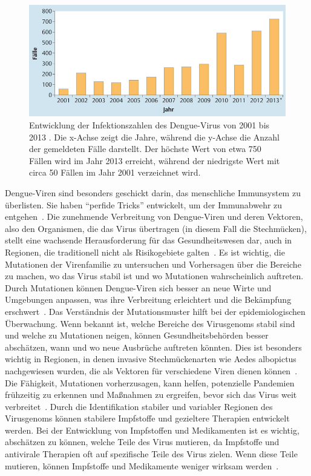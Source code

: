 \documentclass[german,version-2022-01]{uzl-thesis}
\begin{document}
\begin{figure}[tbp]
  \centering
  \includegraphics[scale=0.5]{Images/infektionszahlen_dengue_virus_deutschland.jpeg}
  \caption{Entwicklung der Infektionszahlen des Dengue-Virus von 2001 bis 2013 \cite{cramer_dengue-virus_2014}. Die x-Achse zeigt die Jahre, w\"ahrend die y-Achse die Anzahl der gemeldeten F\"alle darstellt. Der h\"ochste Wert von etwa 750 F\"allen wird im Jahr 2013 erreicht, w\"ahrend der niedrigste Wert mit circa 50 F\"allen im Jahr 2001 verzeichnet wird.}
  \label{fig:Dengue_virus_infektionszahlen_deutschland}
\end{figure} Dengue-Viren sind besonders geschickt darin, das menschliche Immunsystem zu \"uberlisten. Sie haben "`perfide Tricks"' entwickelt, um der Immunabwehr zu entgehen~\cite{janisch_klein_2017}. Die zunehmende Verbreitung von Dengue-Viren und deren Vektoren, also den Organismen, die das Virus \"ubertragen (in diesem Fall die Stechm\"ucken), stellt eine wachsende Herausforderung f\"ur das Gesundheitswesen dar, auch in Regionen, die traditionell nicht als Risikogebiete galten~\cite{cramer_dengue-virus_2014}. Es ist wichtig, die Mutationen der Virenfamilie zu untersuchen und Vorhersagen \"uber die Bereiche zu machen, wo das Virus stabil ist und wo Mutationen wahrscheinlich auftreten. Durch Mutationen k\"onnen Dengue-Viren sich besser an neue Wirte und Umgebungen anpassen, was ihre Verbreitung erleichtert und die Bek\"ampfung erschwert~\cite{cramer_dengue-virus_2014, janisch_klein_2017}. Das Verst\"andnis der Mutationsmuster hilft bei der epidemiologischen \"Uberwachung. Wenn bekannt ist, welche Bereiche des Virusgenoms stabil sind und welche zu Mutationen neigen, k\"onnen Gesundheitsbeh\"orden besser absch\"atzen, wann und wo neue Ausbr\"uche auftreten k\"onnten. Dies ist besonders wichtig in Regionen, in denen invasive Stechm\"uckenarten wie Aedes albopictus nachgewiesen wurden, die als Vektoren f\"ur verschiedene Viren dienen k\"onnen~\cite{cramer_dengue-virus_2014}. Die F\"ahigkeit, Mutationen vorherzusagen, kann helfen, potenzielle Pandemien fr\"uhzeitig zu erkennen und Ma\ss{}nahmen zu ergreifen, bevor sich das Virus weit verbreitet~\cite{janisch_klein_2017}. Durch die Identifikation stabiler und variabler Regionen des Virusgenoms k\"onnen stabilere Impfstoffe und gezieltere Therapien entwickelt werden. Bei der Entwicklung von Impfstoffen und Medikamenten ist es wichtig, absch\"atzen zu k\"onnen, welche Teile des Virus mutieren, da Impfstoffe und antivirale Therapien oft auf spezifische Teile des Virus zielen. Wenn diese Teile mutieren, k\"onnen Impfstoffe und Medikamente weniger wirksam werden~\cite{janisch_klein_2017}. 
\end{document}
